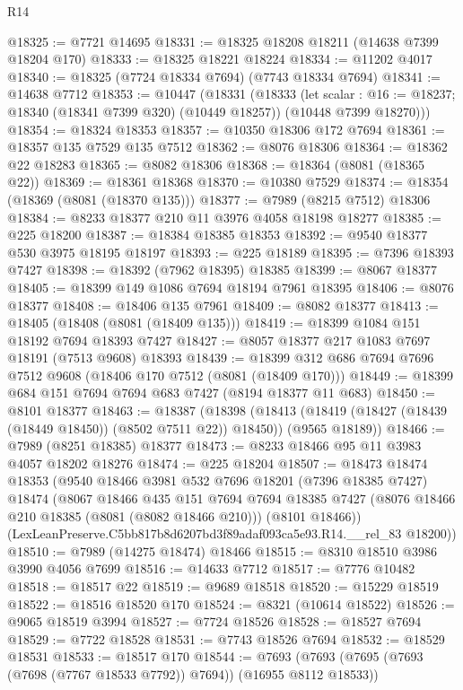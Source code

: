 \begin{lexlean}{R14}
\begin{coremodule}
@18325 := @7721 @14695
@18331 := @18325 @18208 @18211 (@14638 @7399 @18204 @170)
@18333 := @18325 @18221 @18224
@18334 := @11202 @4017
@18340 := @18325 (@7724 @18334 @7694) (@7743 @18334 @7694)
@18341 := @14638 @7712
@18353 := @10447
    (@18331
      (@18333
        (let scalar : @16 := @18237; @18340 (@18341 @7399 @320) (@10449 @18257))
        (@10448 @7399 @18270)))
@18354 := @18324 @18353
@18357 := @10350 @18306 @172 @7694
@18361 := @18357 @135 @7529 @135 @7512
@18362 := @8076 @18306
@18364 := @18362 @22 @18283
@18365 := @8082 @18306
@18368 := @18364 (@8081 (@18365 @22))
@18369 := @18361 @18368
@18370 := @10380 @7529
@18374 := @18354 (@18369 (@8081 (@18370 @135)))
@18377 := @7989 (@8215 @7512) @18306
@18384 := @8233 @18377 @210 @11 @3976 @4058 @18198 @18277
@18385 := @225 @18200
@18387 := @18384 @18385 @18353
@18392 := @9540 @18377 @530 @3975 @18195 @18197
@18393 := @225 @18189
@18395 := @7396 @18393 @7427
@18398 := @18392 (@7962 @18395) @18385
@18399 := @8067 @18377
@18405 := @18399 @149 @1086 @7694 @18194 @7961 @18395
@18406 := @8076 @18377
@18408 := @18406 @135 @7961
@18409 := @8082 @18377
@18413 := @18405 (@18408 (@8081 (@18409 @135)))
@18419 := @18399 @1084 @151 @18192 @7694 @18393 @7427
@18427 := @8057 @18377 @217 @1083 @7697 @18191 (@7513 @9608) @18393
@18439 := @18399 @312 @686 @7694 @7696 @7512 @9608 (@18406 @170 @7512 (@8081 (@18409 @170)))
@18449 := @18399 @684 @151 @7694 @7694 @683 @7427 (@8194 @18377 @11 @683)
@18450 := @8101 @18377
@18463 := @18387
    (@18398
      (@18413 (@18419 (@18427 (@18439 (@18449 @18450)) (@8502 @7511 @22)) @18450))
      (@9565 @18189))
@18466 := @7989 (@8251 @18385) @18377
@18473 := @8233 @18466 @95 @11 @3983 @4057 @18202 @18276
@18474 := @225 @18204
@18507 := @18473
    @18474
    @18353
    (@9540
      @18466
      @3981
      @532
      @7696
      @18201
      (@7396 @18385 @7427)
      @18474
      (@8067
        @18466
        @435
        @151
        @7694
        @7694
        @18385
        @7427
        (@8076 @18466 @210 @18385 (@8081 (@8082 @18466 @210)))
        (@8101 @18466))
      (LexLeanPreserve.C5bb817b8d6207bd3f89adaf093ca5e93.R14.__rel_83 @18200))
@18510 := @7989 (@14275 @18474) @18466
@18515 := @8310 @18510 @3986 @3990 @4056 @7699
@18516 := @14633 @7712
@18517 := @7776 @10482
@18518 := @18517 @22
@18519 := @9689 @18518
@18520 := @15229 @18519
@18522 := @18516 @18520 @170
@18524 := @8321 (@10614 @18522)
@18526 := @9065 @18519 @3994
@18527 := @7724 @18526
@18528 := @18527 @7694
@18529 := @7722 @18528
@18531 := @7743 @18526 @7694
@18532 := @18529 @18531
@18533 := @18517 @170
@18544 := @7693 (@7693 (@7695 (@7693 (@7698 (@7767 @18533 @7792)) @7694)) (@16955 @8112 @18533))

\end{coremodule}
\end{lexlean}
